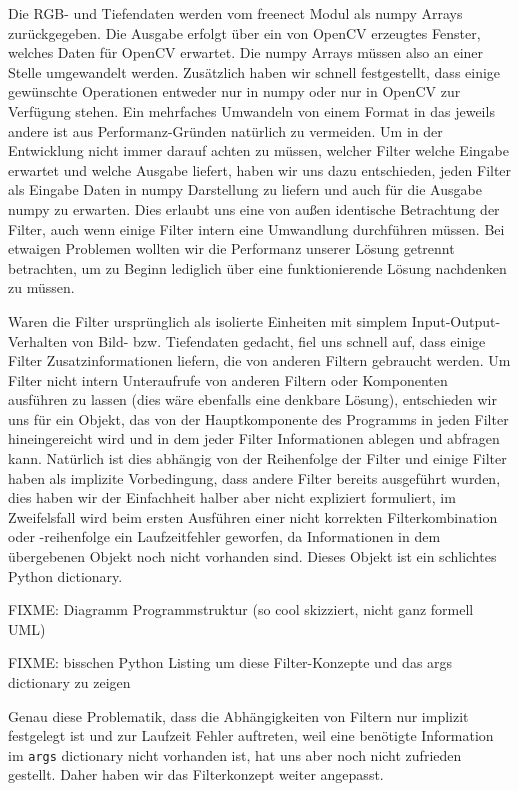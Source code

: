 \documentclass[12pt,a4paper,ngerman]{scrartcl}
\begin{document}
Die RGB- und Tiefendaten werden vom freenect Modul als numpy Arrays zurückgegeben.
Die Ausgabe erfolgt über ein von OpenCV erzeugtes Fenster, welches Daten für
OpenCV erwartet. Die numpy Arrays müssen also an einer Stelle umgewandelt werden.
Zusätzlich haben wir schnell festgestellt, dass einige gewünschte Operationen
entweder nur in numpy oder nur in OpenCV zur Verfügung stehen. Ein mehrfaches
Umwandeln von einem Format in das jeweils andere ist aus Performanz-Gründen
natürlich zu vermeiden. Um in der Entwicklung nicht immer darauf achten zu müssen,
welcher Filter welche Eingabe erwartet und welche Ausgabe liefert, haben wir uns dazu
entschieden, jeden Filter als Eingabe Daten in numpy Darstellung zu liefern und auch
für die Ausgabe numpy zu erwarten. Dies erlaubt uns eine von außen identische
Betrachtung der Filter, auch wenn einige Filter intern eine Umwandlung durchführen
müssen. Bei etwaigen Problemen wollten wir die Performanz unserer Lösung getrennt
betrachten, um zu Beginn lediglich über eine funktionierende Lösung nachdenken
zu müssen.

Waren die Filter ursprünglich als isolierte Einheiten mit simplem
Input-Output-Verhalten von Bild- bzw. Tiefendaten gedacht, fiel uns schnell auf,
dass einige Filter Zusatzinformationen liefern, die von anderen Filtern gebraucht
werden. Um Filter nicht intern Unteraufrufe von anderen Filtern oder Komponenten
ausführen zu lassen (dies wäre ebenfalls eine denkbare Lösung), entschieden wir uns
für ein Objekt, das von der Hauptkomponente des Programms in jeden Filter
hineingereicht wird und in dem jeder Filter Informationen ablegen und abfragen kann.
Natürlich ist dies abhängig von der Reihenfolge der Filter und einige Filter haben
als implizite Vorbedingung, dass andere Filter bereits ausgeführt wurden, dies haben
wir der Einfachheit halber aber nicht expliziert formuliert, im Zweifelsfall wird
beim ersten Ausführen einer nicht korrekten Filterkombination oder -reihenfolge ein
Laufzeitfehler geworfen, da Informationen in dem übergebenen Objekt noch nicht
vorhanden sind. Dieses Objekt ist ein schlichtes Python dictionary.


{\color{red} FIXME: Diagramm Programmstruktur (so cool skizziert, nicht ganz formell UML)}

{\color{red} FIXME: bisschen Python Listing um diese Filter-Konzepte und das args dictionary zu zeigen}

Genau diese Problematik, dass die Abhängigkeiten von Filtern nur implizit festgelegt
ist und zur Laufzeit Fehler auftreten, weil eine benötigte Information im
\lstinline{args} dictionary nicht vorhanden ist, hat uns aber noch nicht zufrieden
gestellt. Daher haben wir das Filterkonzept weiter angepasst.
\end{document}
